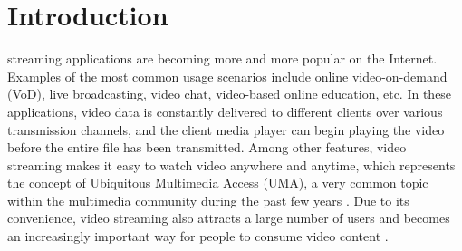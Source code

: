 \documentclass[journal]{IEEEtran}
\begin{document}
%
\IEEEpeerreviewmaketitle



\section{Introduction}
\label{sec:intro}
% 
% 
% 
% 
 streaming applications are becoming more and more popular on the Internet. Examples of the most common usage scenarios include online video-on-demand (VoD), live broadcasting, video chat, video-based online education, etc. In these applications, video data is constantly delivered to different clients over various transmission channels, and the client media player can begin playing the video before the entire file has been transmitted. Among other features, video streaming makes it easy to watch video anywhere and anytime, which represents the concept of Ubiquitous Multimedia Access (UMA), a very common topic within the multimedia community during the past few years \cite{Gualdi08}. Due to its convenience, video streaming also attracts a large number of users and becomes an increasingly important way for people to consume video content \cite{Chen13}.
\end{document}

